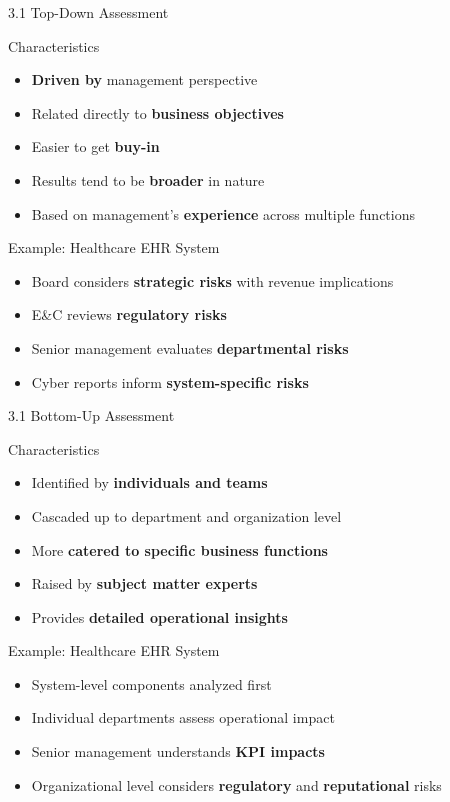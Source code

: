 \documentclass[9pt]{beamer}  %
\begin{document}
	\begin{frame}{3.1 Top-Down Assessment}
		\begin{block}{Characteristics}
			\begin{itemize}
				\item \textbf{Driven by} management perspective
				\item Related directly to \textbf{business objectives}
				\item Easier to get \textbf{buy-in}
				\item Results tend to be \textbf{broader} in nature
				\item Based on management's \textbf{experience} across multiple functions
			\end{itemize}
		\end{block}
		
		\begin{block}{Example: Healthcare EHR System}
			\begin{itemize}
				\item Board considers \textbf{strategic risks} with revenue implications
				\item E\&C reviews \textbf{regulatory risks}
				\item Senior management evaluates \textbf{departmental risks}
				\item Cyber reports inform \textbf{system-specific risks}
			\end{itemize}
		\end{block}
	\end{frame}
	
	\begin{frame}{3.1 Bottom-Up Assessment}
		\begin{block}{Characteristics}
			\begin{itemize}
				\item Identified by \textbf{individuals and teams}
				\item Cascaded up to department and organization level
				\item More \textbf{catered to specific business functions}
				\item Raised by \textbf{subject matter experts}
				\item Provides \textbf{detailed operational insights}
			\end{itemize}
		\end{block}
		
		\begin{block}{Example: Healthcare EHR System}
			\begin{itemize}
				\item System-level components analyzed first
				\item Individual departments assess operational impact
				\item Senior management understands \textbf{KPI impacts}
				\item Organizational level considers \textbf{regulatory} and \textbf{reputational} risks
			\end{itemize}
		\end{block}
	\end{frame}
	
\end{document}

